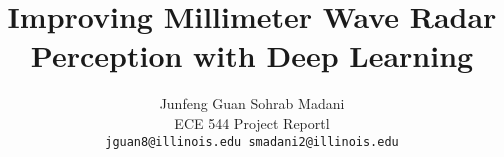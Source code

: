 \documentclass[10pt,twocolumn,letterpaper]{article}
\begin{document}
\title{Improving Millimeter Wave Radar Perception with Deep Learning}

\author{Junfeng Guan \hspace{2cm} Sohrab Madani\\
ECE 544 Project Reportl\\
{\tt\small jguan8@illinois.edu  \hspace{2cm} smadani2@illinois.edu}
}

\maketitle








{\small


}
\end{document}
